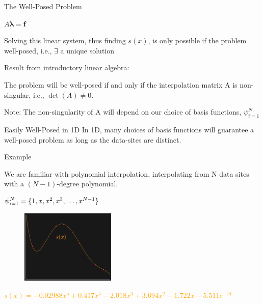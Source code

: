 \documentclass[12pt,t]{beamer}
\newcommand{\subt}[1]{{\footnotesize \color{subtitle} {#1}}}
\begin{document}
\begin{frame}{The Well-Posed Problem}
\begin{center}
$A\boldsymbol{\lambda}=\boldsymbol{f}$
\end{center}

Solving this linear system, thus finding $s(x)$, is only possible if the problem \subt{well-posed}, i.e., $\exists$ a unique solution 
\bigskip
\pause

\subt{Result from introductory linear algebra:} 

The problem will be well-posed if and only if the interpolation matrix A is \subt{non-singular}, i.e., $\det(A)\neq0$.
\bigskip
\pause

\subt{Note:} The non-singularity of A will depend on our choice of basis functions, $\psi_{i=1}^N$

\end{frame}

\begin{frame}{Easily Well-Posed in 1D}
In 1D, many choices of basis functions will guarantee a well-posed problem as long as the data-sites are distinct. 
\bigskip
\pause

\subt{Example}

We are familiar with \subt{polynomial interpolation}, interpolating from N data sites with a $(N-1)$-degree polynomial. 
\begin{center}
$\psi_{i=1}^N=\{1,x,x^2,x^3, \mathellipsis, x^{N-1}\}$
\end{center}
\pause
\begin{figure}
\includegraphics[width=0.4\textwidth, keepaspectratio]{fig3.png}
\end{figure}
\footnotesize{\textcolor{orange}{$s(x)=-0.02988 x^5 + 0.417 x^4 - 2.018 x^3 + 3.694 x^2 - 1.722 x - 5.511e^{-14}$}}
\note{}
\end{frame}
\end{document}
